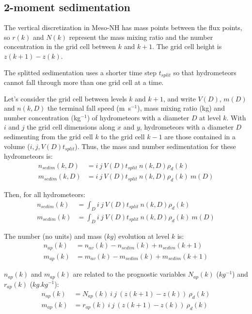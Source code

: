 \subsection{2-moment sedimentation}

The vertical discretization in Meso-NH has mass points between the flux points, so $r(k)$ and $N(k)$ represent the mass mixing ratio and the number concentration in the grid cell between $k$ and $k+1$. The grid cell height is $z(k+1)-z(k)$. 

The splitted sedimentation uses a shorter time step $t_{split}$ so that hydrometeors cannot fall through more than one grid cell at a time.

Let's consider the grid cell between levels $k$ and $k+1$, and write $V(D)$, $m(D)$ and $n(k,D)$ the terminal fall speed (m~s$^{-1}$), mass mixing ratio (kg) and number concentration (kg$^{-1}$) of hydrometeors with a diameter $D$ at level $k$. With $i$ and $j$ the grid cell dimensions along $x$ and $y$, hydrometeors with a diameter $D$ sedimenting from the grid cell $k$ to the grid cell $k-1$ are those contained in a volume ($i, j, V(D)t_{split}$). Thus, the mass and number sedimentation for these hydrometeors is:
\begin{align}
 n_{sedim}(k,D) &= i~j~V(D)t_{split}~n(k,D)\rho_d(k)      \\
 m_{sedim}(k,D) &= i~j~V(D)t_{split}~n(k,D)\rho_d(k)~m(D)
\end{align}

Then, for all hydrometeors:
\begin{align}
 \label{sedim-n}
 n_{sedim}(k) &= \int_D i~j~V(D)t_{split}~n(k,D)\rho_d(k)      \\
 \label{sedim-m}
 m_{sedim}(k) &= \int_D i~j~V(D)t_{split}~n(k,D)\rho_d(k)~m(D)
\end{align}

The number (no units) and mass ($kg$) evolution at level $k$ is:
\begin{align}
 \label{bilan-n}
 n_{ap}(k) &= n_{av}(k) - n_{sedim}(k) + n_{sedim}(k+1)  \\
 \label{bilan-m}
 m_{ap}(k) &= m_{av}(k) - m_{sedim}(k) + m_{sedim}(k+1)
\end{align}

$n_{ap}(k)$ and $m_{ap}(k)$ are related to the prognostic variables $N_{ap}(k)$ ($kg^{-1}$) and $r_{ap}(k)$ ($kg.kg^{-1}$):
\begin{align}
 n_{ap}(k) &= N_{ap}(k) ~ i ~ j ~ (z(k+1)-z(k)) ~ \rho_d(k)  \\
 m_{ap}(k) &= r_{ap}(k) ~ i ~ j ~ (z(k+1)-z(k)) ~ \rho_d(k)
\end{align}

